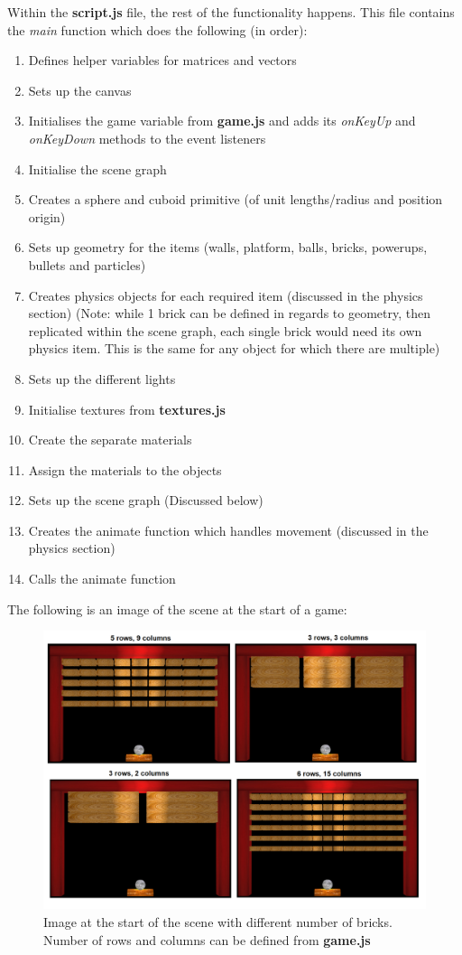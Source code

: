 Within the \textbf{script.js} file, the rest of the functionality happens. This file contains the \textit{main} function which does the following (in order):
\begin{enumerate}
	\item Defines helper variables for matrices and vectors
	\item Sets up the canvas
	\item Initialises the game variable from \textbf{game.js} and adds its \textit{onKeyUp} and \textit{onKeyDown} methods to the event listeners
	\item Initialise the scene graph
	\item Creates a sphere and cuboid primitive (of unit lengths/radius and position origin)
	\item Sets up geometry for the items (walls, platform, balls, bricks, powerups, bullets and particles)
	\item Creates physics objects for each required item (discussed in the physics section) (Note: while 1 brick can be defined in regards to geometry, then replicated within the scene graph, each single brick would need its own physics item. This is the same for any object for which there are multiple)
	\item Sets up the different lights
	\item Initialise textures from \textbf{textures.js}
	\item Create the separate materials
	\item Assign the materials to the objects
	\item Sets up the scene graph (Discussed below)
	\item Creates the animate function which handles movement (discussed in the physics section)
	\item Calls the animate function
\end{enumerate}

The following is an image of the scene at the start of a game:
\begin{figure}[H]
	\centering
	\includegraphics[width=\textwidth]{Images/SceneStart.png}
	\caption{Image at the start of the scene with different number of bricks. Number of rows and columns can be defined from \textbf{game.js}}
\end{figure}

